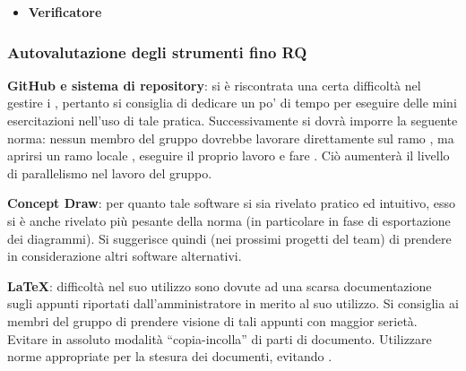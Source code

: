 \begin{itemize}
\item{\textbf{Verificatore}}

\end{itemize}


\subsubsection{Autovalutazione degli strumenti fino RQ}

\begin{description}
	\item \textbf{GitHub e sistema di repository}: si è riscontrata una certa difficoltà nel gestire i , pertanto si consiglia di dedicare un po' di tempo per eseguire delle mini esercitazioni nell'uso di tale pratica. Successivamente si dovrà imporre la seguente norma: nessun membro del gruppo dovrebbe lavorare direttamente sul ramo , ma aprirsi un ramo locale , eseguire il proprio lavoro e fare . Ciò aumenterà il livello di parallelismo nel lavoro del gruppo.
	\item \textbf{Concept Draw}: per quanto tale software si sia rivelato pratico ed intuitivo, esso si è anche rivelato più pesante della norma (in particolare in fase di esportazione dei diagrammi).  Si suggerisce quindi (nei prossimi progetti del team) di prendere in considerazione altri software alternativi.
	\item \textbf{LaTeX}: difficoltà nel suo utilizzo sono dovute ad una scarsa documentazione sugli appunti riportati dall'amministratore in merito al suo utilizzo. Si consiglia ai membri del gruppo di prendere visione di tali appunti con maggior serietà. Evitare in assoluto modalità ``copia-incolla'' di parti di documento. Utilizzare norme appropriate  per la stesura dei documenti, evitando .
\end{description}

